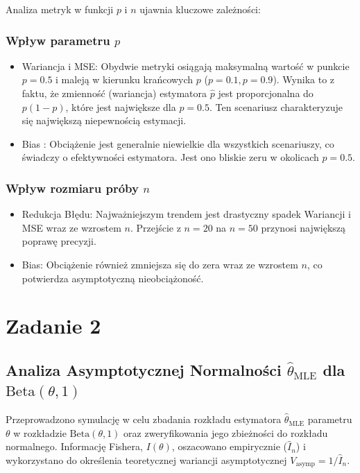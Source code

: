 \documentclass[a4paper,12pt]{article}
\begin{document}
        Analiza metryk w funkcji $p$ i $n$ ujawnia kluczowe zależności:

        \subsubsection*{Wpływ parametru $p$}
        \begin{itemize}
            \item Wariancja i MSE: Obydwie metryki osiągają maksymalną wartość w punkcie $p=0.5$ i maleją w kierunku krańcowych $p$ ($p=0.1, p=0.9$). Wynika to z faktu, że zmienność (wariancja) estymatora $\hat{p}$ jest proporcjonalna do $p(1-p)$, które jest największe dla $p=0.5$. Ten scenariusz charakteryzuje się największą niepewnością estymacji.
            \item Bias : Obciążenie jest generalnie niewielkie dla wszystkich scenariuszy, co świadczy o efektywności estymatora. Jest ono bliskie zeru w okolicach $p=0.5$.
        \end{itemize}

        \subsubsection*{Wpływ rozmiaru próby $n$}
        \begin{itemize}
            \item Redukcja Błędu: Najważniejszym trendem jest drastyczny spadek Wariancji i MSE wraz ze wzrostem $n$. Przejście z $n=20$ na $n=50$ przynosi największą poprawę precyzji.
            \item Bias: Obciążenie również zmniejsza się do zera wraz ze wzrostem $n$, co potwierdza asymptotyczną nieobciążoność.
        \end{itemize}

\newpage

\section{Zadanie 2}

    \subsection{Analiza Asymptotycznej Normalności $\hat{\theta}_{\text{MLE}}$ dla $\text{Beta}(\theta, 1)$}

    Przeprowadzono symulację w celu zbadania rozkładu estymatora $\hat{\theta}_{\text{MLE}}$ parametru $\theta$ 
    w rozkładzie $\text{Beta}(\theta, 1)$ oraz zweryfikowania jego zbieżności do rozkładu normalnego.
    Informację Fishera, $I(\theta)$, oszacowano empirycznie ($\hat{I}_n$) 
    i wykorzystano do określenia teoretycznej wariancji asymptotycznej $V_{\text{asymp}} = 1/\hat{I}_n$.
\end{document}
